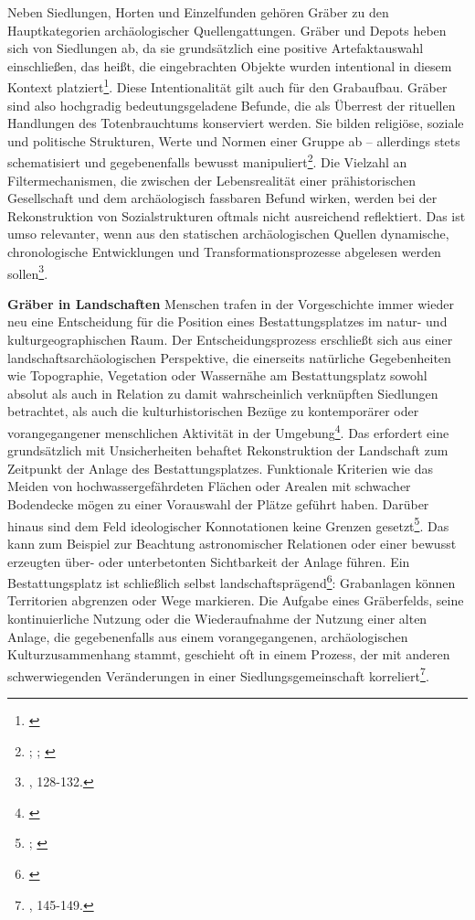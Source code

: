\documentclass[openany,twoside,twocolumn]{book}
\let\rmarkdownfootnote\footnote%
\def\footnote{\protect\rmarkdownfootnote}
\begin{document}
Neben Siedlungen, Horten und Einzelfunden gehören Gräber zu den
Hauptkategorien archäologischer Quellengattungen. Gräber und Depots
heben sich von Siedlungen ab, da sie grundsätzlich eine positive
Artefaktauswahl einschließen, das heißt, die eingebrachten Objekte
wurden intentional in diesem Kontext platziert\footnote{\textcite{eggers_einfuhrung_1959}}.
Diese Intentionalität gilt auch für den Grabaufbau. Gräber sind also
hochgradig bedeutungsgeladene Befunde, die als Überrest der rituellen
Handlungen des Totenbrauchtums konserviert werden. Sie bilden religiöse,
soziale und politische Strukturen, Werte und Normen einer Gruppe ab --
allerdings stets schematisiert und gegebenenfalls bewusst
manipuliert\footnote{\textcite{harke_final_1997};
  \textcite{humphreys_comparative_1981}; \textcite{palgi_death_1984}}.
Die Vielzahl an Filtermechanismen, die zwischen der Lebensrealität einer
prähistorischen Gesellschaft und dem archäologisch fassbaren Befund
wirken, werden bei der Rekonstruktion von Sozialstrukturen oftmals nicht
ausreichend reflektiert. Das ist umso relevanter, wenn aus den
statischen archäologischen Quellen dynamische, chronologische
Entwicklungen und Transformationsprozesse abgelesen werden
sollen\footnote{\textcite{hofmann_rituelle_2008}, 128-132.}.

\textbf{Gräber in Landschaften} \newline  Menschen trafen in der
Vorgeschichte immer wieder neu eine Entscheidung für die Position eines
Bestattungsplatzes im natur- und kulturgeographischen Raum. Der
Entscheidungsprozess erschließt sich aus einer
landschaftsarchäologischen Perspektive, die einerseits natürliche
Gegebenheiten wie Topographie, Vegetation oder Wassernähe am
Bestattungsplatz sowohl absolut als auch in Relation zu damit
wahrscheinlich verknüpften Siedlungen betrachtet, als auch die
kulturhistorischen Bezüge zu kontemporärer oder vorangegangener
menschlichen Aktivität in der Umgebung\footnote{\textcite{balee_historical_1998}}.
Das erfordert eine grundsätzlich mit Unsicherheiten behaftet
Rekonstruktion der Landschaft zum Zeitpunkt der Anlage des
Bestattungsplatzes. Funktionale Kriterien wie das Meiden von
hochwassergefährdeten Flächen oder Arealen mit schwacher Bodendecke
mögen zu einer Vorauswahl der Plätze geführt haben. Darüber hinaus sind
dem Feld ideologischer Konnotationen keine Grenzen gesetzt\footnote{\textcite{artelius_bronze_1998};
  \textcite{stjernquist_introduction_1992-1}}. Das kann zum Beispiel zur
Beachtung astronomischer Relationen oder einer bewusst erzeugten über-
oder unterbetonten Sichtbarkeit der Anlage führen. Ein Bestattungsplatz
ist schließlich selbst landschaftsprägend\footnote{\textcite{enninger_friedhofe_1989}}:
Grabanlagen können Territorien abgrenzen oder Wege markieren. Die
Aufgabe eines Gräberfelds, seine kontinuierliche Nutzung oder die
Wiederaufnahme der Nutzung einer alten Anlage, die gegebenenfalls aus
einem vorangegangenen, archäologischen Kulturzusammenhang stammt,
geschieht oft in einem Prozess, der mit anderen schwerwiegenden
Veränderungen in einer Siedlungsgemeinschaft korreliert\footnote{\textcite{hofmann_rituelle_2008},
  145-149.}.
\end{document}
